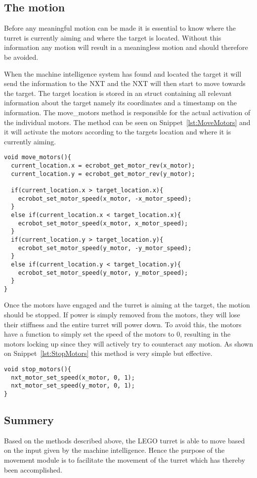 \subsection{The motion}
Before any meaningful motion can be made it is essential to know where the turret is currently aiming and where the target is located.
Without this information any motion will result in a meaningless motion and should therefore be avoided.

When the machine intelligence system has found and located the target it will send the information to the NXT and the NXT will then start to move towards the target.
The target location is stored in an struct containing all relevant information about the target namely its coordinates and a timestamp on the information.
The move\_motors method is responsible for the actual activation of the individual motors.
The method can be seen on Snippet~\ref{lst:MoveMotors} and it will activate the motors according to the targets location and where it is currently aiming.
\begin{lstlisting}[language=CSharp,caption={move\_motors method from movement.c},label={lst:MoveMotors}]
void move_motors(){
  current_location.x = ecrobot_get_motor_rev(x_motor);
  current_location.y = ecrobot_get_motor_rev(y_motor);

  if(current_location.x > target_location.x){
    ecrobot_set_motor_speed(x_motor, -x_motor_speed);
  }
  else if(current_location.x < target_location.x){
    ecrobot_set_motor_speed(x_motor, x_motor_speed);
  }
  if(current_location.y > target_location.y){
    ecrobot_set_motor_speed(y_motor, -y_motor_speed);
  }
  else if(current_location.y < target_location.y){
    ecrobot_set_motor_speed(y_motor, y_motor_speed);
  }
}
\end{lstlisting}
Once the motors have engaged and the turret is aiming at the target, the motion should be stopped.
If power is simply removed from the motors, they will lose their stiffness and the entire turret will power down.
To avoid this, the motors have a function to simply set the speed of the motors to $0$, resulting in the motors locking up since they will actively try to counteract any motion.
As shown on Snippet~\ref{lst:StopMotors} this method is very simple but effective.
\begin{lstlisting}[language=CSharp,label={lst:StopMotors},caption={stop\_motors method from movement.c}]
void stop_motors(){
  nxt_motor_set_speed(x_motor, 0, 1);
  nxt_motor_set_speed(y_motor, 0, 1);
}
\end{lstlisting}

\subsection{Summery}
Based on the methods described above, the LEGO turret is able to move based on the input given by the machine intelligence.
Hence the purpose of the movement module is to facilitate the movement of the turret which has thereby been accomplished.
